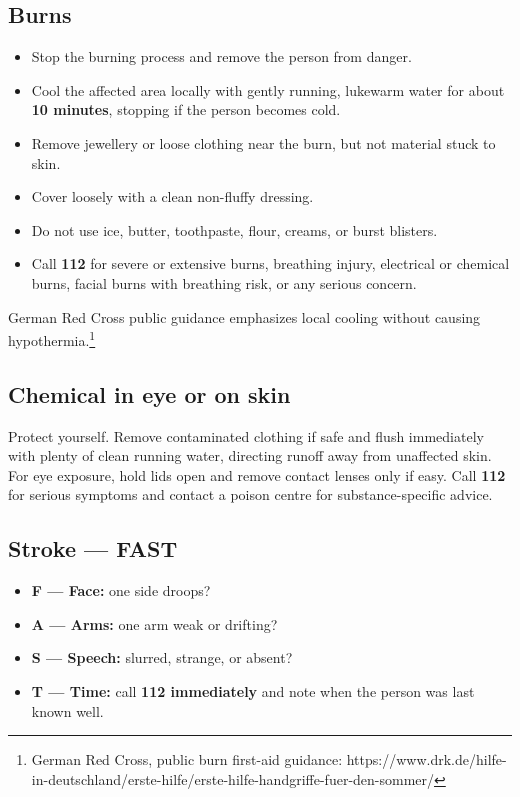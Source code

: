 \hypertarget{burns}{%
\subsection{Burns}\label{burns}}

\begin{itemize}
\tightlist
\item
  Stop the burning process and remove the person from danger.
\item
  Cool the affected area locally with gently running, lukewarm water for
  about \textbf{10 minutes}, stopping if the person becomes cold.
\item
  Remove jewellery or loose clothing near the burn, but not material
  stuck to skin.
\item
  Cover loosely with a clean non-fluffy dressing.
\item
  Do not use ice, butter, toothpaste, flour, creams, or burst blisters.
\item
  Call \textbf{112} for severe or extensive burns, breathing injury,
  electrical or chemical burns, facial burns with breathing risk, or any
  serious concern.
\end{itemize}

German Red Cross public guidance emphasizes local cooling without
causing hypothermia.\footnote{German Red Cross, public burn first-aid
  guidance:
  https://www.drk.de/hilfe-in-deutschland/erste-hilfe/erste-hilfe-handgriffe-fuer-den-sommer/}

\hypertarget{chemical-in-eye-or-on-skin}{%
\subsection{Chemical in eye or on
skin}\label{chemical-in-eye-or-on-skin}}

Protect yourself. Remove contaminated clothing if safe and flush
immediately with plenty of clean running water, directing runoff away
from unaffected skin. For eye exposure, hold lids open and remove
contact lenses only if easy. Call \textbf{112} for serious symptoms and
contact a poison centre for substance-specific advice.

\hypertarget{stroke-fast}{%
\subsection{Stroke --- FAST}\label{stroke-fast}}

\begin{itemize}
\tightlist
\item
  \textbf{F --- Face:} one side droops?
\item
  \textbf{A --- Arms:} one arm weak or drifting?
\item
  \textbf{S --- Speech:} slurred, strange, or absent?
\item
  \textbf{T --- Time:} call \textbf{112 immediately} and note when the
  person was last known well.
\end{itemize}

